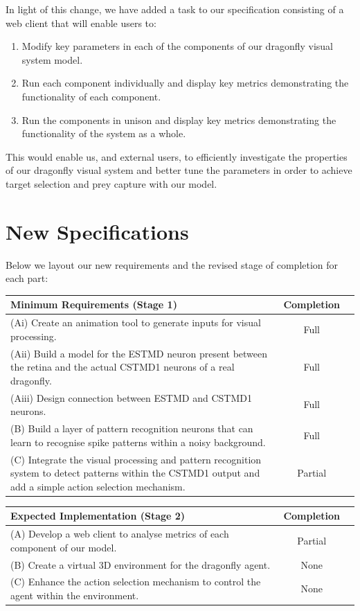 \documentclass[a4paper,11pt]{article}
\begin{document}
In light of this change, we have added a task to our specification consisting of a web client that will enable users to:
\begin{enumerate}
	\item Modify key parameters in each of the components of our dragonfly visual system model.
	\item Run each component individually and display key metrics demonstrating the functionality of each component.
	\item Run the components in unison and display key metrics demonstrating the functionality of the system as a whole.
\end{enumerate}
This would enable us, and external users, to efficiently investigate the properties of our dragonfly visual system and better tune the parameters in order to achieve target selection and prey capture with our model.

\section{New Specifications}
Below we layout our new requirements and the revised stage of completion for each part:
\begin{center}
    \begin{tabular}{p{12cm} c c}
    \textbf{Minimum Requirements (Stage 1)} & \textbf{Completion} \\ \hline
    (Ai) Create an animation tool to generate inputs for visual processing. & Full \\ 
	(Aii) Build a model for the ESTMD neuron present between the retina and the actual CSTMD1 neurons of a real dragonfly. & Full \\
	(Aiii) Design connection between ESTMD and CSTMD1 neurons. & Full \\
	(B) Build a layer of pattern recognition neurons that can learn to recognise spike patterns within a noisy background. & Full\\
	(C) Integrate the visual processing and pattern recognition system to detect patterns within the CSTMD1 output and add a simple action selection mechanism. & Partial\\
    \end{tabular}
\end{center}

\begin{center}
    \begin{tabular}{p{12cm} c c}
    \textbf{Expected Implementation (Stage 2)} & \textbf{Completion} \\ \hline
	(A) Develop a web client to analyse metrics of each component of our model. & Partial \\
	(B) Create a virtual 3D environment for the dragonfly agent. & None\\
	(C) Enhance the action selection mechanism to control the agent within the environment. & None\\
    \end{tabular}
\end{center}
\end{document}
